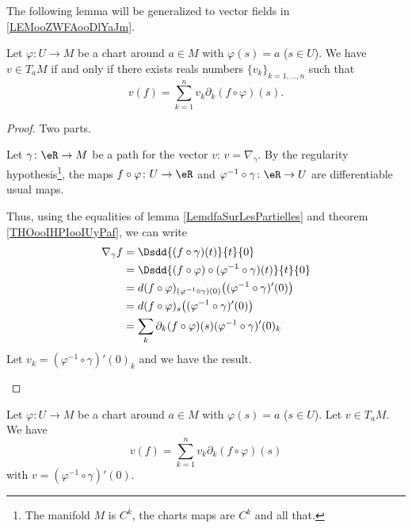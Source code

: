 The following lemma will be generalized to vector fields in \ref{LEMooZWFAooDlYaJm}.
\begin{lemma}       \label{LEMooSCVHooYPiGse}
	Let \( \varphi\colon U\to M\) be a chart around \( a\in M\) with \( \varphi(s)=a\) (\( s\in U\)). We have \( v\in T_aM\) if and only if there exists reals numbers \( \{ v_k \}_{k=1,\ldots, n}\) such that
	\begin{equation}        \label{EQooNEDSooOhyrCZ}
		v(f)=\sum_{k=1}^nv_k\partial_k(f\circ \varphi)(s).
	\end{equation}
\end{lemma}

\begin{proof}
	Two parts.
	\begin{subproof}
		\spitem[\( \Rightarrow\)]
		Let \( \gamma\colon \eR\to M\) be a path for the vector \( v\): \( v=\nabla_{\gamma}\). By the regularity hypothesis\footnote{The manifold \( M\) is \( C^k\), the charts maps are \( C^k\) and all that.}, the maps \( f\circ \varphi\colon U\to \eR\) and \( \varphi^{-1}\circ\gamma\colon \eR \to U \) are differentiable usual maps.

		Thus, using the equalities of lemma \ref{LemdfaSurLesPartielles} and theorem \ref{THOooIHPIooIUyPaf}, we can write
		\begin{subequations}
			\begin{align}
				\nabla_{\gamma}f & =\Dsdd{ (f\circ\gamma)(t) }{t}{0}                                                          \\
				                 & =\Dsdd{ (f\circ\varphi)\circ(\varphi^{-1}\circ\gamma)(t) }{t}{0}                           \\
				                 & =d(f\circ \varphi)_{(\varphi^{-1}\circ\gamma)(0)}\big( (\varphi^{-1}\circ\gamma)'(0) \big) \\
				                 & =d(f\circ \varphi)_{s}\big( (\varphi^{-1}\circ\gamma)'(0) \big)                            \\
				                 & =\sum_k\partial_k(f\circ \varphi)(s)(\varphi^{-1}\circ\gamma)'(0)_k
			\end{align}
		\end{subequations}
		Let \( v_k=(\varphi^{-1}\circ\gamma)'(0)_k\) and we have the result.
		\spitem[$ \Leftarrow$ ]
	\end{subproof}
\end{proof}

\begin{lemma}       \label{LEMooZXEFooZgXbNP}
	Let \( \varphi\colon U\to M\) be a chart around \( a\in M\) with \( \varphi(s)=a\) (\( s\in U\)). Let \( v\in T_aM\). We have
	\begin{equation}
		v(f)=\sum_{k=1}^nv_k\partial_k(f\circ \varphi)(s)
	\end{equation}
	with \( v= (\varphi^{-1}\circ \gamma)'(0)\).
\end{lemma}

